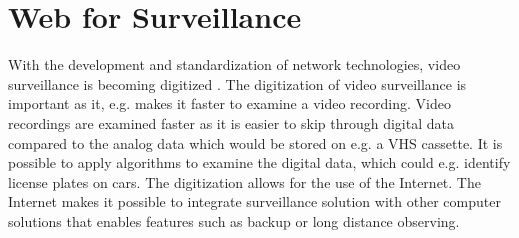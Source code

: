 \section{Web for Surveillance}
With the development and standardization of network technologies, video surveillance is becoming digitized \citep{digitalisering_af_video}.
The digitization of video surveillance is important as it, e.g. makes it faster to examine a video recording.%
Video recordings are examined faster as it is easier to skip through digital data compared to the analog data which would be stored on e.g. a VHS cassette.
It is possible to apply algorithms to examine the digital data, which could e.g. identify license plates on cars.
The digitization allows for the use of the Internet.
The Internet makes it possible to integrate surveillance solution with other computer solutions that enables features such as backup or long distance observing.
